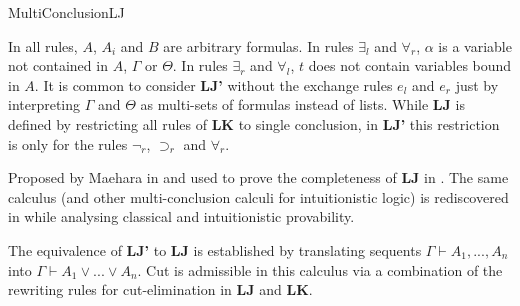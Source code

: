 \begin{entry}{MultiConclusionLJ}
\begin{clarifications}
In all rules, $A$, $A_i$ and $B$ are arbitrary formulas. In rules $\exists_l$
and $\forall_r$, $\alpha$ is a variable not contained in $A$, $\Gamma$ or
$\Theta$. In rules $\exists_r$ and $\forall_l$, $t$ does not contain variables
bound in $A$.
It is common to consider \textbf{LJ'} without the exchange rules $e_l$ and $e_r$ just by
interpreting $\Gamma$ and $\Theta$ as multi-sets of formulas instead of lists.
While \textbf{LJ} is defined by restricting all rules of
\textbf{LK} to single conclusion, in \textbf{LJ'} this
restriction is only for the rules $\neg_r$, $\supset_r$ and $\forall_r$.
\end{clarifications}

\begin{history}
Proposed by Maehara in \cite{Maehara1954} and used to prove the completeness of
\textbf{LJ} in \cite{Takeuti1987}. The same calculus (and other
multi-conclusion calculi for intuitionistic logic) is rediscovered in
\cite{Nadathur1998} while analysing classical and intuitionistic provability.
\end{history}

\begin{technicalities}
The equivalence of \textbf{LJ'} to \textbf{LJ} is established by translating
sequents $\Gamma \vdash A_1, ..., A_n$ into $\Gamma \vdash A_1 \vee ... \vee
A_n$. Cut is admissible in this calculus via a combination of the rewriting
rules for cut-elimination in \textbf{LJ} and \textbf{LK}.
\end{technicalities}

\end{entry}
